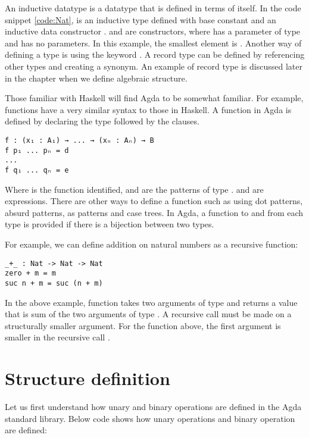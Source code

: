 An inductive datatype is a datatype that is defined in terms of itself. In the
code snippet \ref{code:Nat},  is an inductive type defined with base
constant  and an inductive data constructor .
 and  are constructors, where  has a
parameter of type  and  has no parameters. In this
example, the smallest element is . Another way of defining a type
is using the keyword . A record type can be defined by
referencing other types and creating a synonym. An example of record type is
discussed later in the chapter when we define algebraic structure.

Those familiar with Haskell will find Agda to be somewhat familiar. For example,
functions have a very similar syntax to those in Haskell. A function in Agda is
defined by declaring the type followed by the clauses.

\begin{verbatim}
f : (x₁ : A₁) → ... → (xₙ : Aₙ) → B
f p₁ ... pₙ = d
...
f q₁ ... qₙ = e
\end{verbatim} 
Where  is the function identified,  and  are the
patterns of type .  and  are expressions. There
are other ways to define a function such as using dot patterns, absurd patterns,
as patterns and case trees. In Agda, a function to and from each type is
provided if there is a bijection between two types.

For example, we can define addition on natural numbers as a recursive function:

\label{code:Add}
\begin{verbatim}
_+_ : Nat -> Nat -> Nat
zero + m = m
suc n + m = suc (n + m)
\end{verbatim}

In the above example, function \inline{_+_} takes two arguments of type
 and returns a value that is sum of the two arguments of type
. A recursive call must be made on a structurally smaller argument.
For the function \inline{_+_} above, the first argument  is smaller in
the recursive call . 

\section{Structure definition}
Let us first understand how unary and binary operations are defined in the Agda
standard library. Below code shows how unary operations  and binary
operation  are defined:

